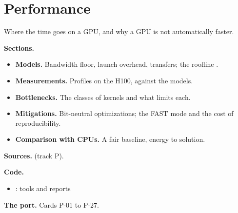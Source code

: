 \chapter{Performance}\label{ch:perf}

Where the time goes on a GPU, and why a GPU is not automatically faster.

\begin{outline}[(card B-18)]
\textbf{Sections.}
\begin{itemize}
    \item \textbf{Models.} Bandwidth floor, launch overhead, transfers; the roofline \citep{williams2009}.
    \item \textbf{Measurements.} Profiles on the H100, against the models.
    \item \textbf{Bottlenecks.} The classes of kernels and what limits each.
    \item \textbf{Mitigations.} Bit-neutral optimizations; the FAST mode and the cost of reproducibility.
    \item \textbf{Comparison with CPUs.} A fair baseline, energy to solution.
\end{itemize}
\textbf{Sources.}  (track P).

\textbf{Code.}
\begin{itemize}
    \item {}: tools and reports
\end{itemize}
\textbf{The port.} Cards P-01 to P-27.
\end{outline}
